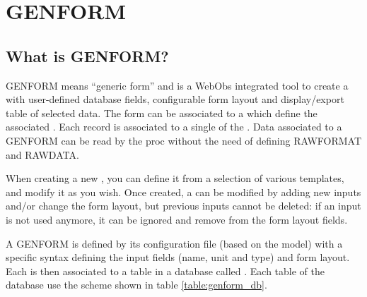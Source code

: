 
\chapter{GENFORM} \label{genform}



\section{What is GENFORM?}

GENFORM means “generic form” and is a WebObs integrated tool to create a  with user-defined database fields, configurable form layout and display/export table of selected data. The form can be associated to a  which define the associated . Each record is associated to a single  of the . Data associated to a GENFORM can be read by the proc without the need of defining RAWFORMAT and RAWDATA.

When creating a new , you can define it from a selection of various templates, and modify it as you wish. Once created, a  can be modified by adding new inputs and/or change the form layout, but previous inputs cannot be deleted: if an input is not used anymore, it can be ignored and remove from the form layout fields.

A GENFORM is defined by its configuration file (based on the  model) with a specific syntax defining the input fields (name, unit and type) and form layout. Each  is then associated to a table in a database called . Each table of the database use the scheme shown in table \ref{table:genform_db}.

